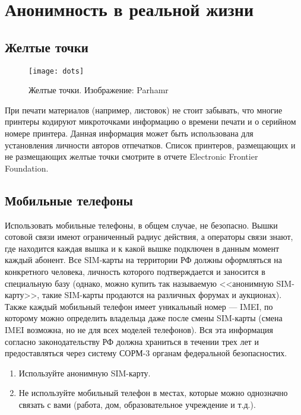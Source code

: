 \chapter{Анонимность в реальной жизни}
\section{Желтые точки}
\begin{wrapfigure}[9]{r}{0.25\linewidth}
\texttt{[image: dots]}
\caption{Желтые точки. Изображение: Parhamr}
\end{wrapfigure}
При печати материалов (например, листовок) не стоит забывать, что многие принтеры  кодируют микроточками информацию о времени печати и о серийном номере принтера\cite{eff_dots}. Данная информация может быть использована для установления личности авторов отпечатков. Список принтеров, размещающих и не размещающих желтые точки смотрите в отчете Electronic Frontier Foundation\cite{eff_list}.
\section{Мобильные телефоны}
Использовать мобильные телефоны, в общем случае, не безопасно. Вышки сотовой связи имеют ограниченный радиус действия, а операторы связи знают, где находится каждая вышка и к какой вышке подключен в данным момент каждый абонент. Все SIM-карты на территории РФ должны оформляться на конкретного человека, личность которого подтверждается и заносится в специальную базу (однако, можно купить так называемую <<анонимную SIM-карту>>, такие SIM-карты продаются на различных форумах и аукционах). Также каждый мобильный телефон имеет уникальный номер --- IMEI, по которому можно определить владельца даже после смены SIM-карты (смена IMEI возможна, но не для всех моделей телефонов). Вся эта информация согласно законодательству РФ должна храниться в течении трех лет и предоставляться через систему СОРМ-3 органам федеральной безопасностих\cite{sorm_sorm3}.
\begin{enumerate}
\item Используйте анонимную SIM-карту.
\item Не используйте мобильный телефон в местах, которые можно однозначно связать с вами (работа, дом, образовательное учреждение и т.д.).
\end{enumerate}
